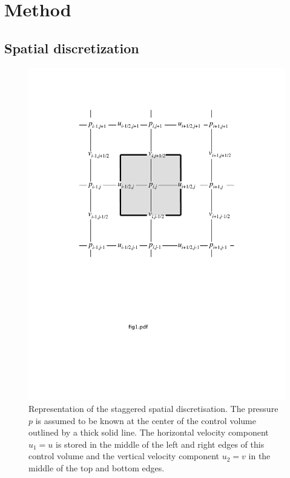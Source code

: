 
\section{Method} %

\subsection{Spatial discretization}

\begin{figure}
\begin{center}
    \includegraphics[width=0.45 \textwidth]{Figures/figure3-1.pdf}
\end{center}
\caption{Representation of the staggered spatial discretisation. The pressure $p$ is assumed to 
be known at the center of the control volume outlined by a thick solid line. The horizontal 
velocity component $u_1=u$ is stored in the middle of the left and right edges of this control 
volume and the vertical velocity component $u_2=v$ in the middle of the top and bottom edges.}
\label{stag-grid}
\end{figure}

